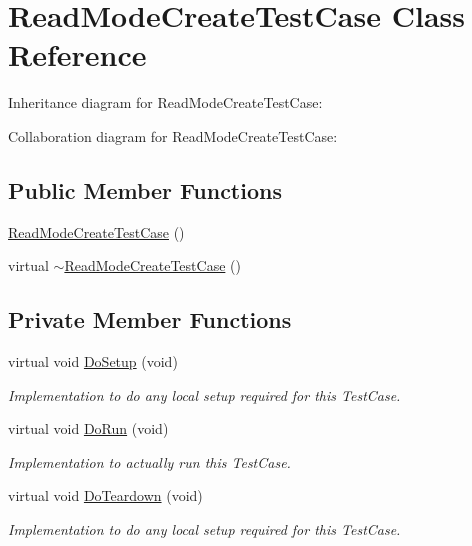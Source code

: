 \hypertarget{classReadModeCreateTestCase}{}\section{Read\+Mode\+Create\+Test\+Case Class Reference}
\label{classReadModeCreateTestCase}


Inheritance diagram for Read\+Mode\+Create\+Test\+Case\+:


Collaboration diagram for Read\+Mode\+Create\+Test\+Case\+:
\subsection*{Public Member Functions}
\begin{DoxyCompactItemize}
\item 
\hyperlink{classReadModeCreateTestCase_ac6102b44dbdde403e44185418adad452}{Read\+Mode\+Create\+Test\+Case} ()
\item 
virtual \hyperlink{classReadModeCreateTestCase_aae8df78bfc581d6a0e147fa265cfc95d}{$\sim$\+Read\+Mode\+Create\+Test\+Case} ()
\end{DoxyCompactItemize}
\subsection*{Private Member Functions}
\begin{DoxyCompactItemize}
\item 
virtual void \hyperlink{classReadModeCreateTestCase_a6dd7e9a6a38fd7f1622950f026af16ae}{Do\+Setup} (void)
\begin{DoxyCompactList}\small\item\em Implementation to do any local setup required for this Test\+Case. \end{DoxyCompactList}\item 
virtual void \hyperlink{classReadModeCreateTestCase_a562663ce527b2afe1a01e530874cd851}{Do\+Run} (void)
\begin{DoxyCompactList}\small\item\em Implementation to actually run this Test\+Case. \end{DoxyCompactList}\item 
virtual void \hyperlink{classReadModeCreateTestCase_ab734bb421701638fe0264099725269e3}{Do\+Teardown} (void)
\begin{DoxyCompactList}\small\item\em Implementation to do any local setup required for this Test\+Case. \end{DoxyCompactList}\end{DoxyCompactItemize}
